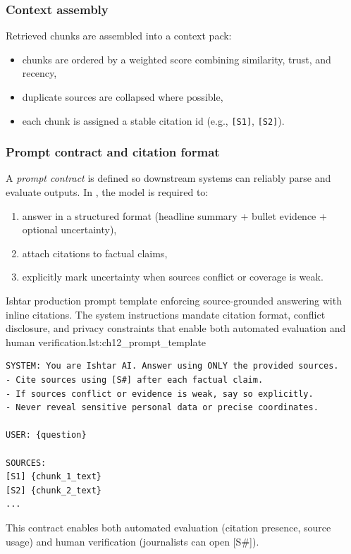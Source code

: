 \subsubsection{Context assembly}
Retrieved chunks are assembled into a context pack:
\begin{itemize}
    \item chunks are ordered by a weighted score combining similarity, trust, and recency,
    \item duplicate sources are collapsed where possible,
    \item each chunk is assigned a stable citation id (e.g., \texttt{[S1]}, \texttt{[S2]}).
\end{itemize}

\subsubsection{Prompt contract and citation format}
A \emph{prompt contract} is defined so downstream systems can reliably parse and evaluate outputs.
In \ishtar{}, the model is required to:
\begin{enumerate}
    \item answer in a structured format (headline summary + bullet evidence + optional uncertainty),
    \item attach citations to factual claims,
    \item explicitly mark uncertainty when sources conflict or coverage is weak.
\end{enumerate}

\begin{codebox}{Ishtar production prompt template enforcing source-grounded answering with inline citations. The system instructions mandate citation format, conflict disclosure, and privacy constraints that enable both automated evaluation and human verification.}{lst:ch12_prompt_template}
\begin{verbatim}
SYSTEM: You are Ishtar AI. Answer using ONLY the provided sources.
- Cite sources using [S#] after each factual claim.
- If sources conflict or evidence is weak, say so explicitly.
- Never reveal sensitive personal data or precise coordinates.

USER: {question}

SOURCES:
[S1] {chunk_1_text}
[S2] {chunk_2_text}
...
\end{verbatim}
\end{codebox}

This contract enables both automated evaluation (citation presence, source usage) and human verification (journalists can open [S\#]).

